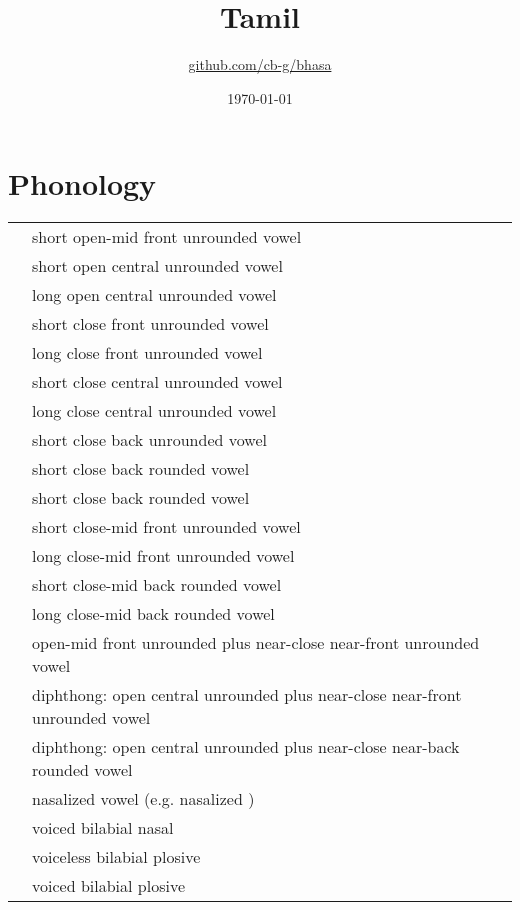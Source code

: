 \documentclass{article}
\title{Tamil\\\ipa{[\textsubbridge{t}ami\:R]}}
\author{\href{https://github.com/cb-g/bhasa}{github.com/cb-g/bhasa}}
\date{\today}
\begin{document}
\pagecolor{custom_bg}\color{custom_fg}
\maketitle\thispagestyle{empty}

\newpage\setcounter{page}{1}\section{Phonology}

\begin{xltabular}{\textwidth}{lL}
   & short open-mid front unrounded vowel \\
   & short open central unrounded vowel \\
   & long open central unrounded vowel \\
   & short close front unrounded vowel \\
   & long close front unrounded vowel \\
   & short close central unrounded vowel \\
   & long close central unrounded vowel \\
   & short close back unrounded vowel \\
   & short close back rounded vowel \\
   & short close back rounded vowel \\
   & short close-mid front unrounded vowel \\
   & long close-mid front unrounded vowel \\
   & short close-mid back rounded vowel \\
   & long close-mid back rounded vowel \\
   & open-mid front unrounded plus near-close near-front unrounded vowel \\
   & diphthong: open central unrounded plus near-close near-front unrounded vowel \\
   & diphthong: open central unrounded plus near-close near-back rounded vowel \\
   & nasalized vowel (e.g. nasalized ) \\
   & voiced bilabial nasal \\
   & voiceless bilabial plosive \\
   & voiced bilabial plosive \\

\end{xltabular}
\end{document}
